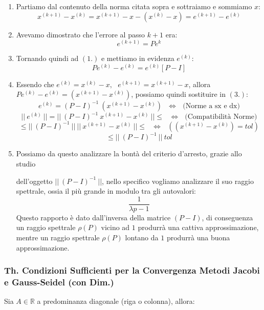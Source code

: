 \documentclass{article}
\begin{document}
\begin{enumerate}
    \item Partiamo dal contenuto della norma citata sopra e sottraiamo e sommiamo $x$:
    \[ x^{(k+1)} - x^{(k)} = x^{(k+1)} - x - ( x^{(k)} - x ) = e^{(k+1)} - e^{(k)}\]
    \item Avevamo dimostrato che l'errore al passo $k+1$ era:
    \[ e^{(k+1)} = Pe^{k} \]
    \item Tornando quindi ad $(1.)$ e mettiamo in evidenza $e^{(k)}$:
    \[ Pe^{(k)} - e^{(k)} = e^{(k)}[P - I] \]
    \item Essendo che $e^{(k)} = x^{(k)} - x, \:\:\: e^{(k+1)} = x^{(k+1)} - x$, allora $ Pe^{(k)} - e^{(k)} = (x^{(k+1)} - x^{(k)} )$, possiamo quindi sostituire in $(3.)$:
    \vspace*{10px}
    \[ e^{(k)} = (P - I)^{-1} \: (x^{(k+1)} - x^{(k)} ) \:\:\: \Leftrightarrow \:\:\: \text{(Norme a sx e dx)} \]
    \vspace*{5px}
    \[ || \: e^{(k)} \:|| = ||\: (P - I)^{-1} \: x^{(k+1)} - x^{(k)} \: || \leq \:\:\: \Leftrightarrow \:\:\: \text{(Compatibilità Norme)} \]
    \vspace*{5px}
    \[ \leq ||\: (P - I)^{-1} \: || \: || \: x^{(k+1)} - x^{(k)} \: || \leq \:\:\: \Leftrightarrow \:\:\: ((x^{(k+1)} - x^{(k)}) = tol) \]
    \vspace*{5px}
    \[ \leq ||\: (P - I)^{-1} \: || \: tol \]
    \newpage
    \item Possiamo da questo analizzare la bontà del criterio d'arresto, grazie allo studio 
    
    dell'oggetto $||\: (P - I)^{-1} \: ||$, nello specifico vogliamo analizzare il suo raggio spettrale, ossia il più grande
    in modulo tra gli autovalori:
    \[ \frac{1}{\lambda p - 1} \]
    Questo rapporto è dato dall'inversa della matrice $(P-I)$, di conseguenza un raggio spettrale $\rho(P)$ vicino ad $1$ produrrà una cattiva approssimazione, 
    mentre un raggio spettrale $\rho(P)$ lontano da $1$ produrrà una buona approssimazione.
    

\end{enumerate}

\subsubsection{Th. Condizioni Sufficienti per la Convergenza Metodi Jacobi e Gauss-Seidel (con Dim.)}

Sia $A \in \mathbb{R}$ a predominanza diagonale (riga o colonna), allora:
\end{document}
